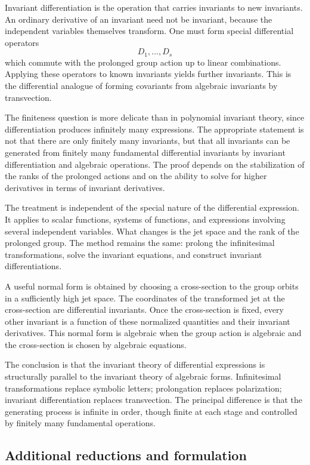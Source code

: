 \documentclass[11pt]{article}
\begin{document}
Invariant differentiation is the operation that carries invariants to new invariants. An ordinary
derivative of an invariant need not be invariant, because the independent variables themselves
transform. One must form special differential operators \[   D_1, \ldots,D_s \] which commute with
the prolonged group action up to linear combinations. Applying these operators to known invariants
yields further invariants. This is the differential analogue of forming covariants from algebraic
invariants by transvection.


The finiteness question is more delicate than in polynomial invariant theory, since differentiation
produces infinitely many expressions. The appropriate statement is not that there are only finitely
many invariants, but that all invariants can be generated from finitely many fundamental
differential invariants by invariant differentiation and algebraic operations. The proof depends on
the stabilization of the ranks of the prolonged actions and on the ability to solve for higher
derivatives in terms of invariant derivatives.


The treatment is independent of the special nature of the differential expression. It applies to
scalar functions, systems of functions, and expressions involving several independent variables.
What changes is the jet space and the rank of the prolonged group. The method remains the same:
prolong the infinitesimal transformations, solve the invariant equations, and construct invariant
differentiations.


A useful normal form is obtained by choosing a cross-section to the group orbits in a sufficiently
high jet space. The coordinates of the transformed jet at the cross-section are differential
invariants. Once the cross-section is fixed, every other invariant is a function of these normalized
quantities and their invariant derivatives. This normal form is algebraic when the group action is
algebraic and the cross-section is chosen by algebraic equations.


The conclusion is that the invariant theory of differential expressions is structurally parallel to
the invariant theory of algebraic forms. Infinitesimal transformations replace symbolic letters;
prolongation replaces polarization; invariant differentiation replaces transvection. The principal
difference is that the generating process is infinite in order, though finite at each stage and
controlled by finitely many fundamental operations.


\subsection{Additional reductions and formulation}
\end{document}

